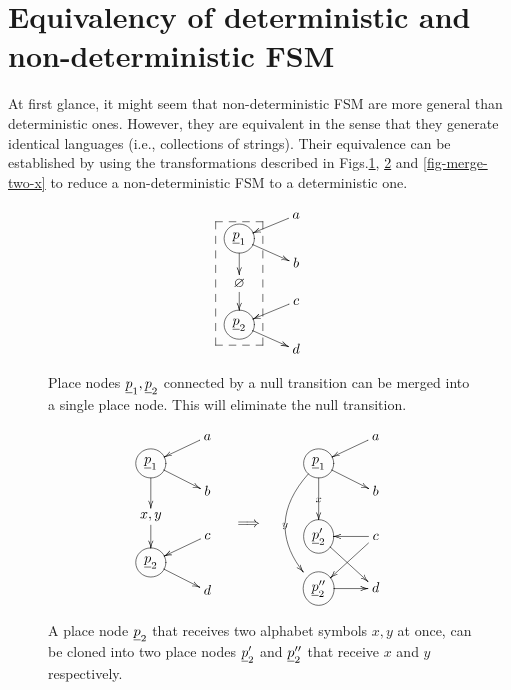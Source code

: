 \section{Equivalency of deterministic and non-deterministic FSM}

At first glance, it might
seem that non-deterministic FSM
are more general than  deterministic ones.
However, they are equivalent
in the sense that they generate identical languages (i.e., collections of strings). Their equivalence can be
established by using the transformations described in Figs.\ref{fig-shrink-null-tra},
\ref{fig-split-x-y}
and \ref{fig-merge-two-x}
to reduce  a non-deterministic FSM
to a deterministic one.


\begin{figure}[h!]
$$
\xymatrix@R=.1pc{
& a\ar[dl]
\\
\Circle{\rvp_1}\ar[rd]
\ar[dd]
\\
& b
\\
\eset\ar[dd]
\\
&c\ar[dl]
\\
\Circle{\rvp_2}\ar[rd]
\\
&d
\save "2,1"."6,1"*++[F--]\frm{}
\restore
}
$$
\caption{Place nodes $\rvp_1, \rvp_2$ connected by
a null transition can be merged into a single
place node. This will eliminate the null transition.}
\label{fig-shrink-null-tra}
\end{figure}

\begin{figure}[h!]
$$
\begin{array}{ccc}
\xymatrix@R=.3pc{
& a\ar[dl]
\\
\Circle{\rvp_1}\ar[rd]
\ar[dd]
\\
& b
\\
x,y\ar[dd]
\\
&c\ar[dl]
\\
\Circle{\rvp_2}\ar[rd]
\\
&d
}
&
\xymatrix
{
\\
\\
\implies}
&
\xymatrix@R=.3pc{
& a\ar[dl]
\\
\Circle{\rvp_1}\ar[rd]
\ar[ddd]|x
\ar@/_2pc/[ddddd]|y
\\
& b
\\
\\
\Circle{\rvp_2'}\ar[rdd]
&c\ar[ldd]\ar[l]
\\
\\
\Circle{\rvp_2''}\ar[r]
&d
}
\end{array}
$$
\caption{A place node $\rvp_2$
that receives two alphabet 
symbols $x, y$ at once, 
can be cloned into two place nodes
$\rvp_2'$ and $\rvp_2''$ that receive
 $x$ and $y$ respectively.
}
\label{fig-split-x-y}
\end{figure}


